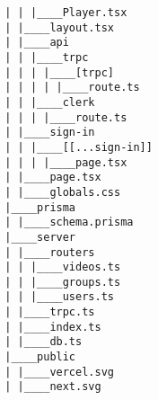 \begin{apendicesenv}
\begin{verbatim}
        | | |____Player.tsx
        | |____layout.tsx
        | |____api
        | | |____trpc
        | | | |____[trpc]
        | | | | |____route.ts
        | | |____clerk
        | | | |____route.ts
        | |____sign-in
        | | |____[[...sign-in]]
        | | | |____page.tsx
        | |____page.tsx
        | |____globals.css
        |____prisma
        | |____schema.prisma
        |____server
        | |____routers
        | | |____videos.ts
        | | |____groups.ts
        | | |____users.ts
        | |____trpc.ts
        | |____index.ts
        | |____db.ts
        |____public
        | |____vercel.svg
        | |____next.svg
        \end{verbatim}       

\end{apendicesenv}
